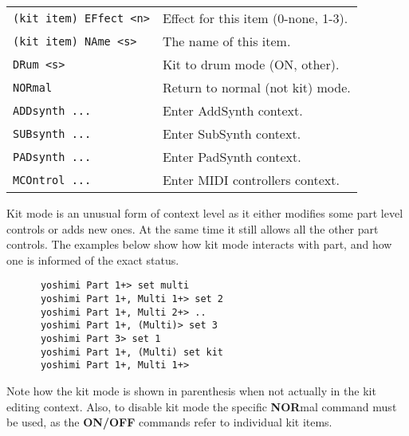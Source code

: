 \begin{center}
\begin{longtable}[l]{ ll}
   \texttt{(kit item) EFfect <n>} &
      Effect for this item (0-none, 1-3). \\
   \texttt{(kit item) NAme <s>} &
      The name of this item. \\
    \texttt{DRum <s>} &
      Kit to drum mode (ON, {other}). \\
    \texttt{NORmal} &
      Return to normal (not kit) mode. \\
\texttt{ADDsynth ...} &
   Enter AddSynth context. \\
\texttt{SUBsynth ...} &
   Enter SubSynth context. \\
\texttt{PADsynth ...} &
   Enter PadSynth context. \\
\texttt{MCOntrol ...} &
   Enter MIDI controllers context. \\
\end{longtable}
\end{center}

   Kit mode is an unusual form of context level as it either modifies some
   part level controls or adds new ones. At the same time it still allows all
   the other part controls. The examples below show how kit mode interacts
   with part, and how one is informed of the exact status.

   \begin{verbatim}
      yoshimi Part 1+> set multi
      yoshimi Part 1+, Multi 1+> set 2
      yoshimi Part 1+, Multi 2+> ..
      yoshimi Part 1+, (Multi)> set 3
      yoshimi Part 3> set 1
      yoshimi Part 1+, (Multi) set kit
      yoshimi Part 1+, Multi 1+>
   \end{verbatim}

   Note how the kit mode is shown in parenthesis when not actually in the kit
   editing context. Also, to disable kit mode the specific \textbf{NOR}mal
   command must be used, as the \textbf{ON/OFF} commands refer to individual
   kit items.


